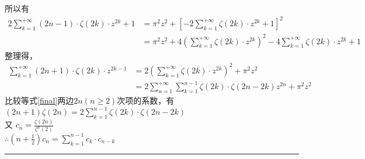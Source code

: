 \documentclass[18pt]{article}
\begin{document}
所以有
\begin{align*}
	2\sum\limits_{k=1}^{+\infty}(2n-1)\cdot \zeta(2k) \cdot z^{2k}+1 &=\pi^2 z^2+[-2\sum\limits_{k=1}^{+\infty}\zeta(2k) \cdot z^{2k}+1]^2\\
	&=\pi^2 z^2+4(\sum\limits_{k=1}^{+\infty}\zeta(2k) \cdot z^{2k})^2-4\sum\limits_{k=1}^{+\infty}\zeta(2k) \cdot z^{2k}+1
\end{align*}
整理得，
\begin{equation}
	\begin{split}
		\sum\limits_{k=1}^{+\infty}(2n+1)\cdot \zeta(2k) \cdot z^{2k-1} &=2(\sum\limits_{k=1}^{+\infty}\zeta(2k) \cdot z^{2k})^2+\pi^2 z^2 \\
		&=2\sum\limits_{n=1}^{+\infty}\sum\limits_{k=1}^{n-1}\zeta(2k)\cdot\zeta(2n-2k) z^{2n}+\pi^2 z^2 \label{final}
	\end{split}
\end{equation}
比较等式\eqref{final}两边$2n(n\geq2)$次项的系数，有\\
$(2n+1)\zeta(2n)=2\sum\limits_{k=1}^{n-1}\zeta(2k)\cdot\zeta(2n-2k)$\\
又 \quad$c_{n}=\frac{\zeta(2n)}{\zeta^n(2)}$\\
$\therefore (n+\frac{1}{2})c_{n}=\sum\limits_{k=1}^{n-1}c_{k}\cdot c_{n-k}$ \quad \rule{3mm}{3mm}\\
\\
\\
\\
\end{document}
